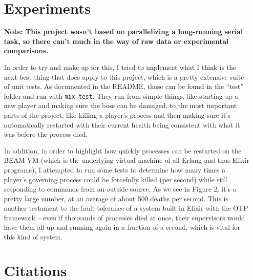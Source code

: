 \documentclass[letterpaper]{article}
\begin{document}
	\section{Experiments}

	\textbf{Note: This project wasn't based on parallelizing a long-running serial task, so there can't much in the way of raw data or experimental comparisons.}

	In order to try and make up for this, I tried to implement what I think is the next-best thing that does apply to this project, which is a pretty extensive suite of unit tests. As documented in the README, those can be found in the ``test'' folder and run with \texttt{mix test}. They run from simple things, like starting up a new player and making sure the boss can be damaged, to the most important parts of the project, like killing a player's process and then making sure it's automatically restarted with their current health being consistent with what it was before the process died.

	In addition, in order to highlight how quickly processes can be restarted on the BEAM VM (which is the underlying virtual machine of all Erlang and thus Elixir programs), I attempted to run some tests to determine how many times a player's governing process could be forcefully killed (per second) while still responding to commands from an outside source. As we see in Figure 2, it's a pretty large number, at an average of about 500 deaths per second. This is another testament to the fault-tolerance of a system built in Elixir with the OTP framework -- even if thousands of processes died at once, their supervisors would have them all up and running again in a fraction of a second, which is vital for this kind of system.

	\section{Citations}
\end{document}
